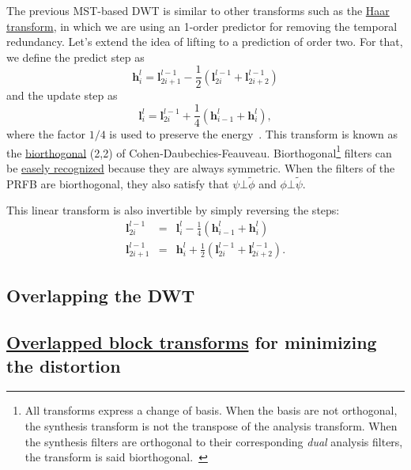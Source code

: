 The previous MST-based DWT is similar to other transforms such as the
\href{https://en.wikipedia.org/wiki/Haar_wavelet}{Haar transform}, in
which we are using an 1-order predictor for removing the temporal
redundancy. Let's extend the idea of lifting to a prediction of order
two. For that, we define the predict step as
\begin{equation}
  {\mathbf h}^l_i = {\mathbf l}^{l-1}_{2i+1} - \frac{1}{2}({\mathbf l}^{l-1}_{2i} + {\mathbf l}^{l-1}_{2i+2})
\end{equation}
and the update step as
\begin{equation}
  {\mathbf l}^l_i = {\mathbf l}^{l-1}_{2i} + \frac{1}{4}({\mathbf h}^l_{i-1} + {\mathbf h}^l_i),
\end{equation}
where the factor $1/4$ is used to preserve the
energy~\cite{sweldens1997building}. This transform is known as the
\href{https://en.wikipedia.org/wiki/Biorthogonal_wavelet}{biorthogonal}
(2,2) of Cohen-Daubechies-Feauveau.  Biorthogonal\footnote{All
transforms express a change of basis. When the basis are not
orthogonal, the synthesis transform is not the transpose of the
analysis transform. When the synthesis filters are orthogonal to their
corresponding \emph{dual} analysis filters, the transform is said
biorthogonal.~\cite{vetterli2014foundations}} filters can be
\href{http://wavelets.pybytes.com/}{easely recognized} because they
are always symmetric. When the filters of the PRFB are biorthogonal,
they also satisfy that $\psi\bot\tilde\phi$ and $\phi\bot\tilde\psi$.

This linear transform is also invertible by simply reversing the steps:
\begin{equation}
  \begin{array}{rcl}
    {\mathbf l}^{l-1}_{2i} & = & {\mathbf l}^l_i - \frac{1}{4}({\mathbf h}^l_{i-1} + {\mathbf h}^l_i)\\
    {\mathbf l}^{l-1}_{2i+1} & = & {\mathbf h}^l_i + \frac{1}{2}({\mathbf l}^{l-1}_{2i} + {\mathbf l}^{l-1}_{2i+2}).
  \end{array}
\end{equation}



\subsection{Overlapping the DWT}

\subsection{\href{https://en.wikipedia.org/wiki/Lapped_transform}{Overlapped block transforms} for minimizing the distortion}

